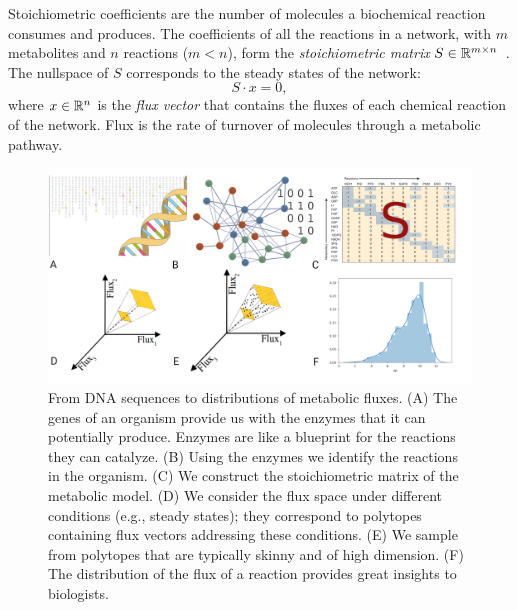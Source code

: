    Stoichiometric coefficients are the number of molecules a biochemical reaction
   consumes and produces. The coefficients of all the reactions in a network,
   with $m$ metabolites and $n$ reactions ($m < n$),  form
   the \emph{stoichiometric matrix} $S\in {\mathbb R}^{m\times n}$~\citep{palsson2015systems}.
   The nullspace of $S$ corresponds to the steady states of the network:
   \begin{equation}
   \label{eq:Sv}
   S \cdot x = 0 ,
   \end{equation}
   where $x \in {\mathbb R}^n $ is the \textit{flux vector} that contains  the fluxes
   of each chemical reaction of the network.
   Flux is the rate of turnover of molecules through a metabolic pathway.
   \begin{figure}[!htbp]
      \includegraphics[width=1.0\columnwidth]{figures/flux_sampling_workflow.png}
      \caption[From DNA sequences to distributions of metabolic fluxes]{
         From DNA sequences to distributions of metabolic fluxes.
         (A) The genes of an organism provide us with the enzymes that it can potentially produce. Enzymes are like a blueprint for the reactions they can catalyze.
         (B) Using the enzymes we identify the reactions in the organism.
         (C) We construct the stoichiometric matrix of the metabolic  model.
         (D) We consider the flux space under different conditions (e.g., steady states);
         they correspond  to  polytopes containing flux vectors addressing these conditions.
         (E) We sample from polytopes that are typically skinny and of high dimension.
         (F) The distribution of the flux of a reaction provides  great insights
         to biologists.
      }
      \label{fig:sampling_workflow}
   \end{figure}


